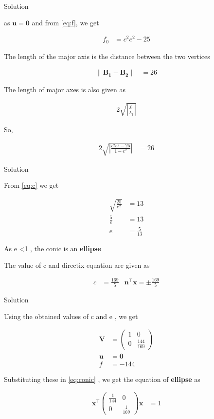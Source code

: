 \documentclass{beamer}
\numberwithin{equation}{section}
\theoremstyle{remark}
\providecommand{\norm}[1]{\lVert#1\rVert}
\newcommand{\myvec}[1]{\ensuremath{\begin{pmatrix}#1\end{pmatrix}}}
\let\vec\mathbf
\begin{document}
\begin{frame}{Solution}

as $\vec{u}=\vec{0}$ and from \eqref{eq:f}, we get 

\begin{align}
  f_0 &= c^2e^2 - 25 
\end{align}

The length of the major axis is the distance between the two vertices 

\begin{align}
  \norm{\vec{B_1}-\vec{B_2}} &= 26
\end{align}

The length of major axes is also given as 

\begin{align}
  2\sqrt{\left|\frac{f_0}{\lambda_1}\right|}
\end{align}

So,

\begin{align}
  2\sqrt{\left|\frac{c^2e^2 - 25}{1 - e^2}\right|} &= 26
\end{align}

\end{frame}

\begin{frame}{Solution}

From \eqref{eq:c} we get 

\begin{align}
  \sqrt{\frac{25}{e^2}} &= 13\\
  \frac{5}{e} &= 13\\
  e &= \frac{5}{13}
\end{align}

As e \textless 1 , the conic is an \textbf{ellipse}

The value of c and directix equation are given as 

\begin{align}
  c &= \frac{169}{5} & \vec{n}^\top\vec{x} = \pm \frac{169}{5}
\end{align}

\end{frame}

\begin{frame}{Solution}

Using the obtained values of c and e , we get 

\begin{align}
  \vec{V} &= \myvec{1 & 0\\0 & \tfrac{144}{169}}\\
  \vec{u} &= \vec{0}\\
  f &= -144
\end{align}

Substituting these in \eqref{eq:conic} , we get the equation of \textbf{ellipse} as 

\begin{align}
  \vec{x}^\top\myvec{\tfrac{1}{144} & 0\\0 & \tfrac{1}{169}}\vec{x} &= 1\\
\end{align}

\end{frame}
\end{document}
